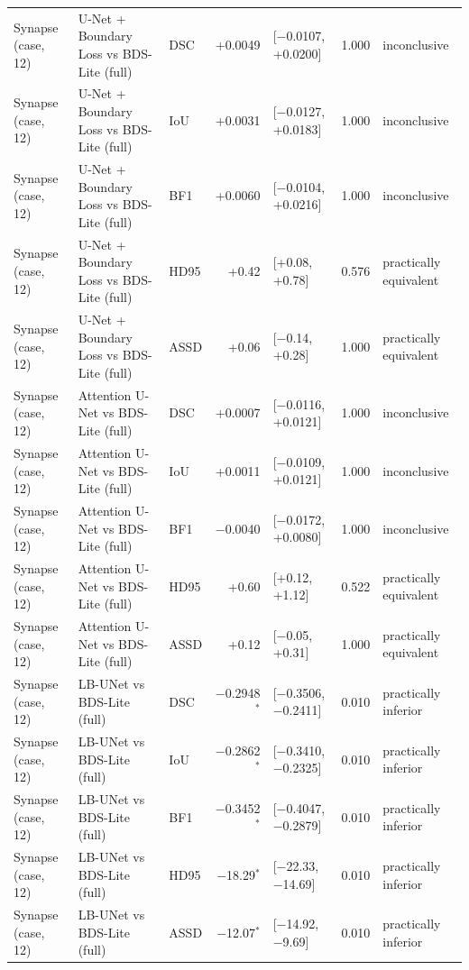 \begin{tabular}{lllrlll}
Synapse (case, 12) & U-Net + Boundary Loss vs BDS-Lite (full) & DSC & +0.0049 & [$-$0.0107, +0.0200] & 1.000 & inconclusive \\
Synapse (case, 12) & U-Net + Boundary Loss vs BDS-Lite (full) & IoU & +0.0031 & [$-$0.0127, +0.0183] & 1.000 & inconclusive \\
Synapse (case, 12) & U-Net + Boundary Loss vs BDS-Lite (full) & BF1 & +0.0060 & [$-$0.0104, +0.0216] & 1.000 & inconclusive \\
Synapse (case, 12) & U-Net + Boundary Loss vs BDS-Lite (full) & HD95 & +0.42 & [+0.08, +0.78] & 0.576 & practically equivalent \\
Synapse (case, 12) & U-Net + Boundary Loss vs BDS-Lite (full) & ASSD & +0.06 & [$-$0.14, +0.28] & 1.000 & practically equivalent \\
Synapse (case, 12) & Attention U-Net vs BDS-Lite (full) & DSC & +0.0007 & [$-$0.0116, +0.0121] & 1.000 & inconclusive \\
Synapse (case, 12) & Attention U-Net vs BDS-Lite (full) & IoU & +0.0011 & [$-$0.0109, +0.0121] & 1.000 & inconclusive \\
Synapse (case, 12) & Attention U-Net vs BDS-Lite (full) & BF1 & $-$0.0040 & [$-$0.0172, +0.0080] & 1.000 & inconclusive \\
Synapse (case, 12) & Attention U-Net vs BDS-Lite (full) & HD95 & +0.60 & [+0.12, +1.12] & 0.522 & practically equivalent \\
Synapse (case, 12) & Attention U-Net vs BDS-Lite (full) & ASSD & +0.12 & [$-$0.05, +0.31] & 1.000 & practically equivalent \\
Synapse (case, 12) & LB-UNet vs BDS-Lite (full) & DSC & $-$0.2948$^{*}$ & [$-$0.3506, $-$0.2411] & 0.010 & practically inferior \\
Synapse (case, 12) & LB-UNet vs BDS-Lite (full) & IoU & $-$0.2862$^{*}$ & [$-$0.3410, $-$0.2325] & 0.010 & practically inferior \\
Synapse (case, 12) & LB-UNet vs BDS-Lite (full) & BF1 & $-$0.3452$^{*}$ & [$-$0.4047, $-$0.2879] & 0.010 & practically inferior \\
Synapse (case, 12) & LB-UNet vs BDS-Lite (full) & HD95 & $-$18.29$^{*}$ & [$-$22.33, $-$14.69] & 0.010 & practically inferior \\
Synapse (case, 12) & LB-UNet vs BDS-Lite (full) & ASSD & $-$12.07$^{*}$ & [$-$14.92, $-$9.69] & 0.010 & practically inferior \\
\bottomrule
\end{tabular}
